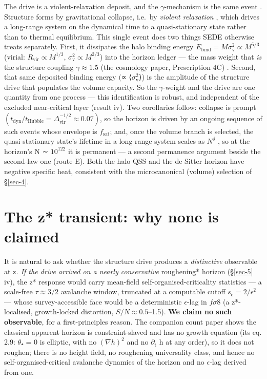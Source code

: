\documentclass[aps,prd,preprint,nofootinbib,superscriptaddress]{revtex4-2}
\begin{document}
The drive is a violent-relaxation deposit, and the \(\gamma\)-mechanism
is the same event . Structure forms by gravitational collapse, i.e.~by
\emph{violent relaxation} \cite{LyndenBell:1967}, which drives a
long-range system on the dynamical time to a quasi-stationary state
rather than to thermal equilibrium. This single event does two things
SEDE otherwise treats separately. First, it dissipates the halo binding
energy
\(E_{\mathrm{bind}} = M\sigma _{\mathrm{v}}^{2} \propto  M^{5/3}\)
(virial: \(R_{\mathrm{vir}} \propto  M^{1/3}\),
\(\sigma _{\mathrm{v}}^{2} \propto  M^{2/3}\)) into the horizon ledger
--- the mass weight that \emph{is} the structure coupling
\(\gamma  \approx  1.5\) (the cosmology paper, Prescription 4C)
\cite{Pandev:2026cosmology}. Second, that same deposited binding energy
\((\)∝ ⟨\(\sigma _{\mathrm{v}}^{2}\)⟩) is the amplitude of the structure
drive that populates the volume capacity. So the \(\gamma\)-weight and
the drive are one quantity from one process --- this identification is
robust, and independent of the excluded near-critical layer (result iv).
Two corollaries follow: collapse is prompt
\((t_{\mathrm{dyn}}/t_{\mathrm{Hubble}} = \Delta _{\mathrm{vir}}^{-1/2} \approx  0.07)\),
so the horizon is driven by an ongoing sequence of such events whose
envelope is \(f_{\mathrm{sat}}\); and, once the volume branch is
selected, the quasi-stationary state's lifetime in a long-range system
scales as \(N^{\delta }\) \cite{Campa:2009jxa}, so at the horizon's N ∼
\(10^{122}\) it is permanent --- a second permanence argument beside the
second-law one (route E). Both the halo QSS and the de Sitter horizon
have negative specific heat, consistent with the microcanonical (volume)
selection of §\ref{sec-4}.

\section{The z* transient: why none is claimed}\label{sec-6}

It is natural to ask whether the structure drive produces a
\emph{distinctive} observable at z\emph{. If the drive arrived on a
nearly conservative }roughening* horizon (§\ref{sec-5} iv), the z*
response would carry mean-field self-organised-criticality statistics
--- a scale-free \(\tau  \approx  3/2\) avalanche window, truncated at a
computable cutoff \(s_{\mathrm{c}} = 2/\epsilon ^{2}\) --- whose
survey-accessible face would be a deterministic \(\epsilon\)-lag in
\(f\sigma 8\) (a z*-localised, growth-locked distortion,
\(S/N \approx  0.5\)--1.5). \textbf{We claim no such observable}, for a
first-principles reason. The companion count paper
\cite{Pandev:2026count} shows the classical apparent horizon is
constraint-slaved and has no growth equation (its eq. 2.9: \(\theta\)₊ =
0 is elliptic, with no \((\nabla h)^{2}\) and no
\(\partial _{\mathrm{t}}\) h at any order), so it does not roughen;
there is no height field, no roughening universality class, and hence no
self-organised-critical avalanche dynamics of the horizon and no
\(\epsilon\)-lag derived from one.
\end{document}
